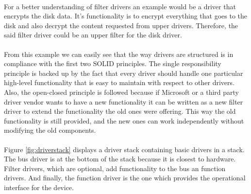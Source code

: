 	   	\paragraph{}
	   	For a better understanding of filter drivers an example would be a driver that encrypts the disk data. It's functionality is to encrypt everything that goes to the disk and also decrypt the content requested from upper drivers. Therefore, the said filter driver could be an upper filter for the disk driver.
	   
	   	\paragraph{}
	   	From this example we can easily see that the way drivers are structured is in compliance with the first two SOLID principles. The single responsibility principle is backed up by the fact that every driver should handle one particular high-level functionality that is easy to maintain with respect to other drivers. Also, the open-closed principle is followed because if Microsoft or a third party driver vendor wants to have a new functionality it can be written as a new filter driver to extend the functionality the old ones were offering. This way the old functionality is still provided, and the new ones can work independently without modifying the old components.
	   
	   	\paragraph{}
	   	Figure \ref{fig:driverstack} displays a driver stack containing basic drivers in a stack. The bus driver is at the bottom of the stack because it is closest to hardware. Filter drivers, which are optional, add functionality to the bus an function drivers. And finally, the function driver is the one which provides the operational interface for the device.
	    
